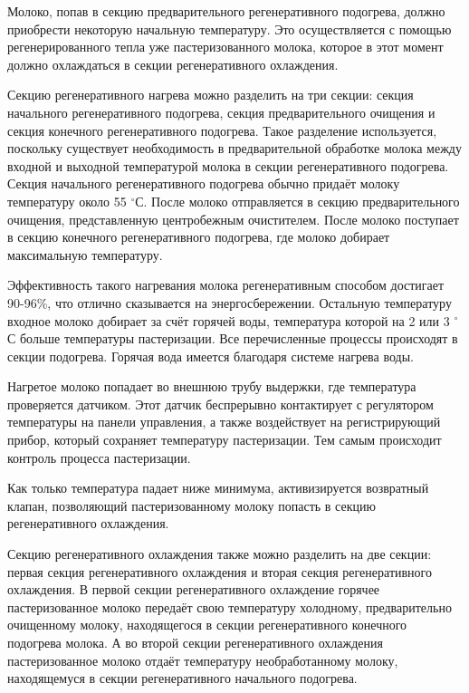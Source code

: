 {  \par \redline Молоко, попав в секцию предварительного регенеративного подогрева, должно приобрести некоторую начальную температуру. Это осуществляется с помощью регенерированного тепла уже пастеризованного молока, которое в этот момент должно охлаждаться в секции регенеративного охлаждения. 

  \par \redline Секцию регенеративного нагрева можно разделить на три секции: секция начального регенеративного подогрева, секция предварительного очищения и секция конечного регенеративного подогрева. Такое разделение используется, поскольку существует необходимость в предварительной обработке молока между входной и выходной температурой молока в секции регенеративного подогрева. Секция начального регенеративного подогрева обычно придаёт молоку температуру около 55 $^{\circ}$С. После молоко отправляется в секцию предварительного очищения, представленную центробежным очистителем. После молоко поступает в секцию конечного регенеративного подогрева, где молоко добирает максимальную температуру. 

  \par \redline Эффективность такого нагревания молока регенеративным способом достигает 90-96\%, что отлично сказывается на энергосбережении. Остальную температуру входное молоко добирает за счёт горячей воды, температура которой на 2 или 3 $^{\circ}$С больше температуры пастеризации. Все перечисленные процессы происходят в секции подогрева. Горячая вода имеется благодаря системе нагрева воды.

  \par \redline Нагретое молоко попадает во внешнюю трубу выдержки, где температура проверяется датчиком. Этот датчик беспрерывно контактирует с регулятором температуры на панели управления, а также воздействует на регистрирующий прибор, который сохраняет температуру пастеризации. Тем самым происходит контроль процесса пастеризации.

  \par \redline Как только температура падает ниже минимума, активизируется возвратный клапан, позволяющий пастеризованному молоку попасть в секцию регенеративного охлаждения.
  
  \par \redline Секцию регенеративного охлаждения также можно разделить на две секции: первая секция регенеративного охлаждения и вторая секция регенеративного охлаждения. В первой секции регенеративного охлаждение горячее пастеризованное молоко передаёт свою температуру холодному, предварительно очищенному молоку, находящегося в секции регенеративного конечного подогрева молока. А во второй секции регенеративного охлаждения пастеризованное молоко отдаёт температуру необработанному молоку, находящемуся в секции регенеративного начального подогрева. 

}

